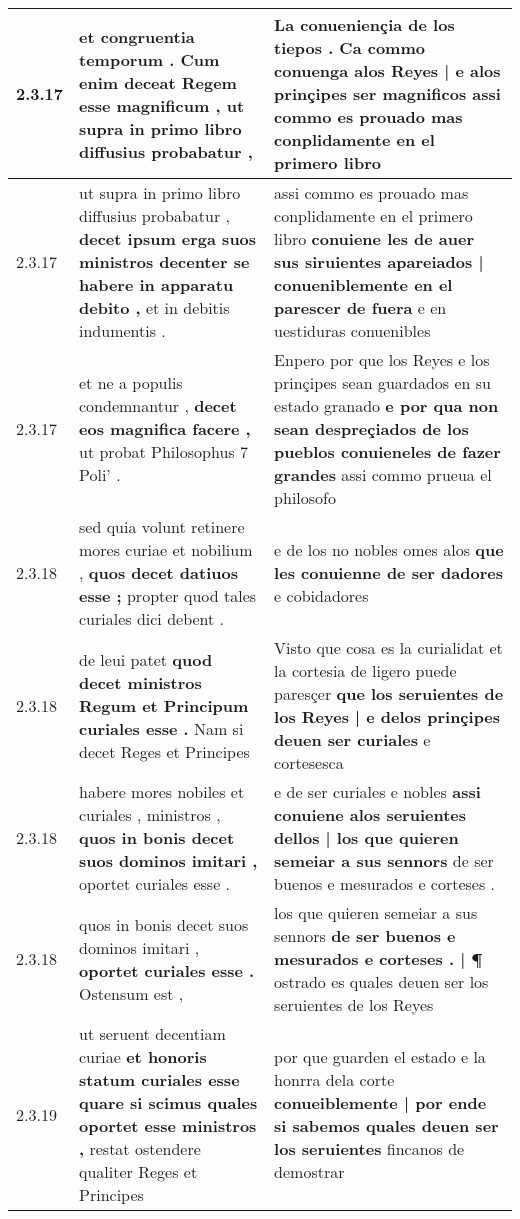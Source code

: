 \begin{tabular}{|p{1cm}|p{6.5cm}|p{6.5cm}|}
2.3.17 & et congruentia temporum . \textbf{ Cum enim deceat Regem esse magnificum , } ut supra in primo libro diffusius probabatur , & La conueniençia de los tiepos . \textbf{ Ca commo conuenga alos Reyes | e alos prinçipes ser magnificos } assi commo es prouado mas conplidamente en el primero libro \\\hline
2.3.17 & ut supra in primo libro diffusius probabatur , \textbf{ decet ipsum erga suos ministros decenter se habere in apparatu debito , } et in debitis indumentis . & assi commo es prouado mas conplidamente en el primero libro \textbf{ conuiene les de auer sus siruientes apareiados | conueniblemente en el parescer de fuera } e en uestiduras conuenibles \\\hline
2.3.17 & et ne a populis condemnantur , \textbf{ decet eos magnifica facere , } ut probat Philosophus 7 Poli’ . & Enpero por que los Reyes e los prinçipes sean guardados en su estado granado \textbf{ e por qua non sean despreçiados de los pueblos conuieneles de fazer grandes } assi commo prueua el philosofo \\\hline
2.3.18 & sed quia volunt retinere mores curiae et nobilium , \textbf{ quos decet datiuos esse ; } propter quod tales curiales dici debent . & e de los no nobles omes alos \textbf{ que les conuienne de ser dadores } e cobidadores \\\hline
2.3.18 & de leui patet \textbf{ quod decet ministros Regum et Principum curiales esse . } Nam si decet Reges et Principes & Visto que cosa es la curialidat et la cortesia de ligero puede paresçer \textbf{ que los seruientes de los Reyes | e delos prinçipes deuen ser curiales } e cortesesca \\\hline
2.3.18 & habere mores nobiles et curiales , ministros , \textbf{ quos in bonis decet suos dominos imitari , } oportet curiales esse . & e de ser curiales e nobles \textbf{ assi conuiene alos seruientes dellos | los que quieren semeiar a sus sennors } de ser buenos e mesurados e corteses . \\\hline
2.3.18 & quos in bonis decet suos dominos imitari , \textbf{ oportet curiales esse . } Ostensum est , & los que quieren semeiar a sus sennors \textbf{ de ser buenos e mesurados e corteses . | ¶ } ostrado es quales deuen ser los seruientes de los Reyes \\\hline
2.3.19 & ut seruent decentiam curiae \textbf{ et honoris statum curiales esse quare si scimus quales oportet esse ministros , } restat ostendere qualiter Reges et Principes & por que guarden el estado e la honrra dela corte \textbf{ conueiblemente | por ende si sabemos quales deuen ser los seruientes } fincanos de demostrar \\\hline

\end{tabular}
